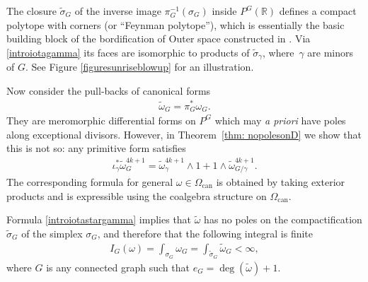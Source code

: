 \documentclass[pdftex]{sigma}%
\numberwithin{equation}{section}
\newcommand{\R}{\mathbb R}
\newcommand{\can}{\mathrm{can}}
\newcommand{\0}{\color{blue}{\mathsf{0}}}
\begin{document}
The closure $\widetilde{\sigma}_G$ of the inverse image $\pi_G^{-1}(\sigma_G)$ inside $P^G(\R)$ defines a compact polytope with corners (or ``Feynman polytope''), which is essentially the basic building block of the bordification of Outer space constructed in \cite{BordificationOuterSpace}. Via \eqref{introiotagamma} its faces are isomorphic to products of $\widetilde{\sigma}_{\gamma}$, where~$\gamma$ are minors of $G$. See Figure \ref{figuresunriseblowup} for an illustration.

 Now consider the pull-backs of canonical forms
 \begin{gather*}
 \widetilde{\omega}_G=\pi_G^* \omega_G .
 \end{gather*}
 They are meromorphic differential forms on $P^G$
which may \emph{a priori} have poles along exceptional divisors. However, in Theorem~\ref{thm: nopolesonD} we show that this is not so: any primitive form satisfies \begin{gather} \label{introiotastargamma} \iota^*_{\gamma} \widetilde{\omega}^{4k+1}_G = \widetilde{\omega}^{4k+1}_{\gamma} \wedge 1 + 1 \wedge \widetilde{\omega}^{4k+1}_{G/\gamma}.
 \end{gather}
 The corresponding formula for general $\omega \in \Omega_{\can}$
 is obtained by taking exterior products and is expressible using the coalgebra structure on $\Omega_{\can}$.

Formula \eqref{introiotastargamma} implies that $\widetilde{\omega}$ has no poles on the compactification $\widetilde{\sigma}_G$ of the simplex $\sigma_G$, and therefore that the following integral is finite
 \begin{gather*}
 I_G (\omega) = \int_{\sigma_G} \omega_G = \int_{\widetilde{\sigma}_G} \widetilde{\omega}_G < \infty ,
 \end{gather*}
where $G$ is any connected graph such that $e_G = \deg(\widetilde{\omega})+1$.
\end{document}

